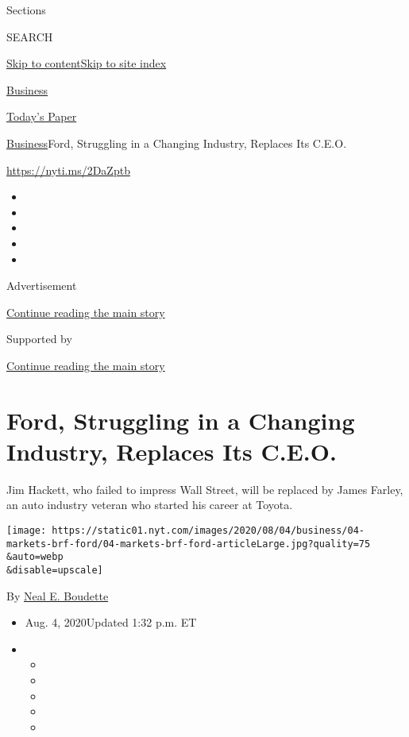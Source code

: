 Sections

SEARCH

\protect\hyperlink{site-content}{Skip to
content}\protect\hyperlink{site-index}{Skip to site index}

\href{https://www.nytimes.com/section/business}{Business}

\href{https://myaccount.nytimes.com/auth/login?response_type=cookie\&client_id=vi}{}

\href{https://www.nytimes.com/section/todayspaper}{Today's Paper}

\href{/section/business}{Business}\textbar{}Ford, Struggling in a
Changing Industry, Replaces Its C.E.O.

\url{https://nyti.ms/2DaZptb}

\begin{itemize}
\item
\item
\item
\item
\item
\end{itemize}

Advertisement

\protect\hyperlink{after-top}{Continue reading the main story}

Supported by

\protect\hyperlink{after-sponsor}{Continue reading the main story}

\hypertarget{ford-struggling-in-a-changing-industry-replaces-its-ceo}{%
\section{Ford, Struggling in a Changing Industry, Replaces Its
C.E.O.}\label{ford-struggling-in-a-changing-industry-replaces-its-ceo}}

Jim Hackett, who failed to impress Wall Street, will be replaced by
James Farley, an auto industry veteran who started his career at Toyota.

\texttt{[image: https://static01.nyt.com/images/2020/08/04/business/04-markets-brf-ford/04-markets-brf-ford-articleLarge.jpg?quality=75\\\&auto=webp\\\&disable=upscale]}

By \href{https://www.nytimes.com/by/neal-e-boudette}{Neal E. Boudette}

\begin{itemize}
\item
  Aug. 4, 2020Updated 1:32 p.m. ET
\item
  \begin{itemize}
  \item
  \item
  \item
  \item
  \item
  \end{itemize}
\end{itemize}

